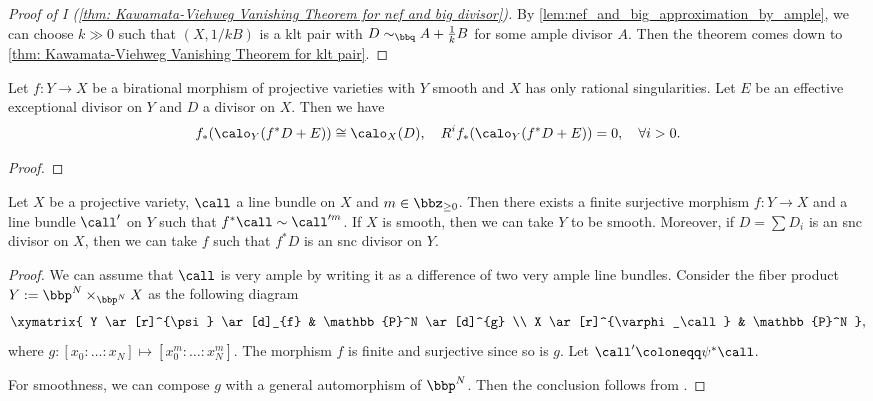     \begin{proof}[Proof of I (\cref{thm: Kawamata-Viehweg Vanishing Theorem for nef and big divisor})]
        By \cref{lem:nef_and_big_approximation_by_ample}, we can choose \(k \gg 0\) such that \((X,1/k B)\) is a klt pair with \(D \sim_\bbq A + \frac{1}{k}B\) for some ample divisor \(A\).
        Then the theorem comes down to \cref{thm: Kawamata-Viehweg Vanishing Theorem for klt pair}.
    \end{proof}

    \begin{lemma}\label{lem:higher_direct_image_of_exceptional_divisor}
        Let \(f:Y \to X\) be a birational morphism of projective varieties with \(Y\) smooth and \(X\) has only rational singularities.
        Let \(E\) be an effective exceptional divisor on \(Y\) and \(D\) a divisor on \(X\).
        Then we have
        \[ f_*(\calo_Y(f^*D + E)) \cong \calo_X(D), \quad R^if_*(\calo_Y(f^*D + E)) = 0,\quad \forall i > 0. \]
    \end{lemma}
    \begin{proof}
    \end{proof}

    \begin{lemma}\label{lem: divide a divisor by a finite surjective morphism}
        Let \(X\) be a projective variety, \(\call\) a line bundle on \(X\) and \(m \in \bbz_{\geq 0}\).
        Then there exists a finite surjective morphism \(f: Y \to X\) and a line bundle \(\call'\) on \(Y\) such that \(f^*\call \sim \call'^{m}\).
        If \(X\) is smooth, then we can take \(Y\) to be smooth.
        Moreover, if \(D = \sum D_i\) is an snc divisor on \(X\), then we can take \(f\) such that \(f^*D\) is an snc divisor on \(Y\).
    \end{lemma}
    \begin{proof}
        We can assume that \(\call\) is very ample by writing it as a difference of two very ample line bundles.
        Consider the fiber product \(Y:= \bbp^N \times_{\bbp^N} X\) as the following diagram
        \[ \xymatrix{
            Y \ar[r]^{\psi} \ar[d]_{f} & \mathbb{P}^N \ar[d]^{g} \\
            X \ar[r]^{\varphi_\call} & \mathbb{P}^N
        }, \]
        where \(g: [x_0: \ldots: x_N] \mapsto [x_0^m: \ldots: x_N^m]\).
        The morphism \(f\) is finite and surjective since so is \(g\).
        Let \(\call'\coloneqq \psi^*\call\).

        For smoothness, we can compose \(g\) with a general automorphism of \(\bbp^N\).
        Then the conclusion follows from \cite[Chapter III, Theorem 10.8]{Har77}.
    \end{proof}

